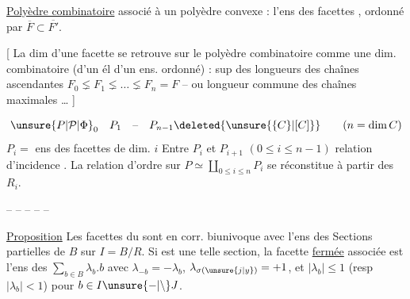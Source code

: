 \uline{Polyèdre combinatoire} associé à un polyèdre convexe :
l'ens des facettes ,  ordonné par $\overline F\subset\overline{F'}$.

[ La dim d'une facette se retrouve sur le
polyèdre combinatoire comme une dim.
combinatoire (d'un él d'un ens. ordonné) :
sup des longueurs des chaînes ascendantes
$F_0\lneq F_1\lneq\ldots\lneq F_n=F$ -- ou longueur commune
des chaînes maximales \ldots{} ]

\[
\unsure{P|\mathcal P|\Phi}_0\quad P_1\quad\text{--}\quad
P_{n-1}\deleted{\unsure{\{C\}|[C]}}\qquad (n=\dim C)
\]
 $P_i=$ ens des facettes de dim. $i$
Entre $P_i$ et $P_{i+1}$ $(0\leq i\leq n-1)$ relation d'incidence .
La relation d'ordre sur $P\simeq\coprod_{0\leq i\leq n}P_i$ se
réconstitue à partir des $R_i$.

\begin{center}-- -- -- -- --\end{center}

\uline{Proposition} Les facettes \inserted{$\ne\varnothing$} du   sont en
corr. biunivoque avec l'ens des  Sections
partielles de $B$ sur $I=B/R$. Si
est une telle section, la
facette \uline{fermée}  associée est l'ens des
$\displaystyle\sum_{b\in B}\lambda_b.b$ avec $\lambda_{-b}=-\lambda_b$, $\lambda_{\sigma(\unsure{j|y})}=+1$, et
$|\lambda_b|\leq 1$ (resp $|\lambda_b|<1$) pour $b\in I\unsure{-|\setminus}J$.
